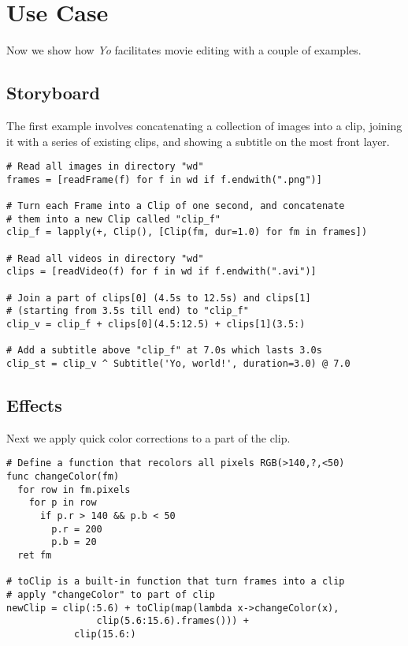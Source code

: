 \documentclass[12pt]{article}
\begin{document}
\section{Use Case}

Now we show how \textit{Yo} facilitates movie editing with a couple of examples.

\subsection{Storyboard}
The first example involves concatenating a collection of images into a clip, joining it with a series of existing clips, and showing a subtitle on the most front layer.
  
\begin{lstlisting}[caption=Arrange clips and add subtitles]
# Read all images in directory "wd"
frames = [readFrame(f) for f in wd if f.endwith(".png")]

# Turn each Frame into a Clip of one second, and concatenate
# them into a new Clip called "clip_f"
clip_f = lapply(+, Clip(), [Clip(fm, dur=1.0) for fm in frames])

# Read all videos in directory "wd"
clips = [readVideo(f) for f in wd if f.endwith(".avi")]

# Join a part of clips[0] (4.5s to 12.5s) and clips[1] 
# (starting from 3.5s till end) to "clip_f"
clip_v = clip_f + clips[0](4.5:12.5) + clips[1](3.5:)

# Add a subtitle above "clip_f" at 7.0s which lasts 3.0s
clip_st = clip_v ^ Subtitle('Yo, world!', duration=3.0) @ 7.0
\end{lstlisting}

\subsection{Effects}
Next we apply quick color corrections to a part of the clip.
\begin{lstlisting}[caption=Add effects to frames]
# Define a function that recolors all pixels RGB(>140,?,<50)
func changeColor(fm)
  for row in fm.pixels
    for p in row
      if p.r > 140 && p.b < 50
        p.r = 200
        p.b = 20
  ret fm

# toClip is a built-in function that turn frames into a clip 
# apply "changeColor" to part of clip
newClip = clip(:5.6) + toClip(map(lambda x->changeColor(x),
				clip(5.6:15.6).frames())) + 
            clip(15.6:)
\end{lstlisting}
\end{document}
